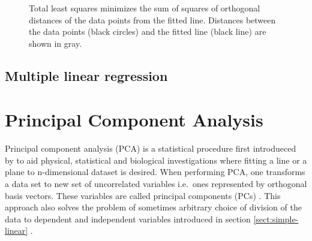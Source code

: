 \documentclass[english, oneside]{HYgradu}
\newcommand{\matr}[1]{\mathbf{#1}}
\begin{document}
\begin{figure}
    \centering
    
    \caption{Total least squares minimizes the sum of squares of orthogonal distances of the data points from the fitted line. Distances between the data points (black circles) and the fitted line (black line) are shown in gray.}\label{fig:TLS}
\end{figure}



\subsection{Multiple linear regression}










\section{Principal Component Analysis}
Principal component analysis (PCA) is a statistical procedure first introdueced by \citet{pearson1901lines} to aid physical, statistical and biological investigations where fitting a line or a plane to n-dimensional dataset is desired. When performing PCA, one transforms a data set to new set of uncorrelated variables i.e.\ ones represented by orthogonal basis vectors. These variables are called principal components (PCs) \citep{jolliffe2002principal}. This approach also solves the problem of sometimes arbitrary choice of division of the data to dependent and independent variables introduced in section \ref{sect:simple-linear} \citep{pearson1901lines}. 
\end{document}
